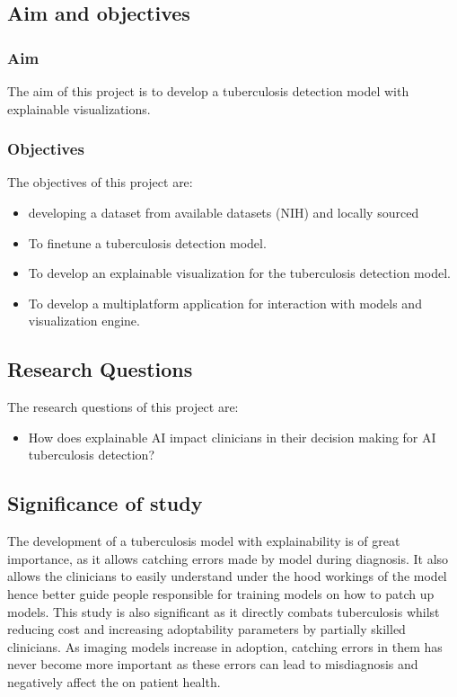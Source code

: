 \documentclass[12pt,a4paper]{article}
\begin{document}
\subsection{Aim and objectives}
\subsubsection{Aim}
The aim of this project is to develop a tuberculosis detection model with explainable visualizations.
\subsubsection{Objectives}
The objectives of this project are:
\begin{itemize}
    \item developing a dataset from available datasets (NIH) and locally sourced 
    \item To finetune a tuberculosis detection model.
    \item To develop an explainable visualization for the tuberculosis detection model.
    \item To develop a multiplatform application for interaction with models and visualization engine.
\end{itemize}

\subsection{Research Questions}
The research questions of this project are:
\begin{itemize}
    \item How does explainable AI impact clinicians in their decision making for AI tuberculosis detection?
\end{itemize}

\subsection{Significance of study}
The development of a tuberculosis model with explainability is of great importance, as it allows catching errors made by model during diagnosis. It also allows the clinicians to easily understand under the hood workings of the model hence better guide people responsible for training models on how to patch up models.
This study is also significant as it directly combats tuberculosis whilst reducing cost and increasing adoptability parameters by partially skilled clinicians.
As imaging models increase in adoption, catching errors in them has never become more important as these errors can lead to misdiagnosis and negatively affect the on patient health. 
\end{document}
